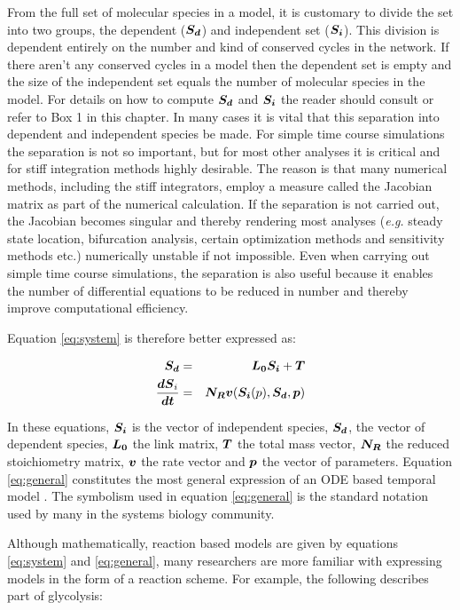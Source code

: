 \documentclass[]{article}
\begin{document}
From the full set of molecular species in a model, it is customary to
divide the set into two groups, the dependent ($\mbox{\boldmath $S_d$}$) and independent
set ($\mbox{\boldmath $S_i$}$). This division is dependent entirely on the number and kind
of conserved cycles in the network. If there aren't any conserved cycles
in a model then the dependent set is empty and the size of the
independent set equals the number of molecular species in the model. For
details on how to compute $\mbox{\boldmath $S_d$}$ and $\mbox{\boldmath $S_i$}$ the reader should consult
\autocite{Sauro:ICycles2004} or refer to Box 1 in this chapter. In many
cases it is vital that this separation into dependent and independent
species be made. For simple time course simulations the separation is
not so important, but for most other analyses it is critical and for
stiff integration methods highly desirable. The reason is that many
numerical methods, including the stiff integrators, employ a measure
called the Jacobian matrix as part of the numerical calculation. If the
separation is not carried out, the Jacobian becomes singular and thereby
rendering most analyses (\emph{e.g.} steady state location, bifurcation
analysis, certain optimization methods and sensitivity methods etc.)
numerically unstable if not impossible. Even when carrying out simple
time course simulations, the separation is also useful because it
enables the number of differential equations to be reduced in number and
thereby improve computational efficiency.

Equation \ref{eq:system} is therefore better expressed as:

\begin{eqnarray} \label{eq:general}
        \mbox{\boldmath $S_d$} &=& \mbox{\boldmath $L_0$} \mbox{\boldmath $S_i$} + \mbox{\boldmath $T$} \nonumber \\
        \mbox{$\displaystyle \frac{\mbox{\boldmath $dS$}_i}{\mbox{\boldmath $dt$}}$} &=& \mbox{\boldmath $N_R$} \mbox{\boldmath $v$} (\mbox{\boldmath $S_i$} (p), \mbox{\boldmath $S_d$}, \mbox{\boldmath $p$}) 
\end{eqnarray}

In these equations, $\mbox{\boldmath $S_i$}$ is the vector of independent species, $\mbox{\boldmath $S_d$}$,
the vector of dependent species, $\mbox{\boldmath $L_0$}$ the link matrix, $\mbox{\boldmath $T$}$ the total
mass vector, $\mbox{\boldmath $N_R$}$ the reduced stoichiometry matrix, $\mbox{\boldmath $v$}$ the rate
vector and $\mbox{\boldmath $p$}$ the vector of parameters. Equation \ref{eq:general}
constitutes the most general expression of an ODE based temporal model
\autocite{hofmeyr-nutshell}\autocite{Schuster:Book}. The symbolism used
in equation \ref{eq:general} is the standard notation used by many in
the systems biology community.

Although mathematically, reaction based models are given by equations
\ref{eq:system} and \ref{eq:general}, many researchers are more familiar
with expressing models in the form of a reaction scheme. For example,
the following describes part of glycolysis:
\end{document}

